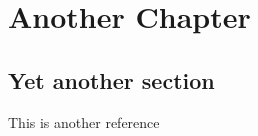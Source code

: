 \chapter{Another Chapter}

\section{Yet another section}

This is another reference~\cite{ref2} \lipsum[12-13]
